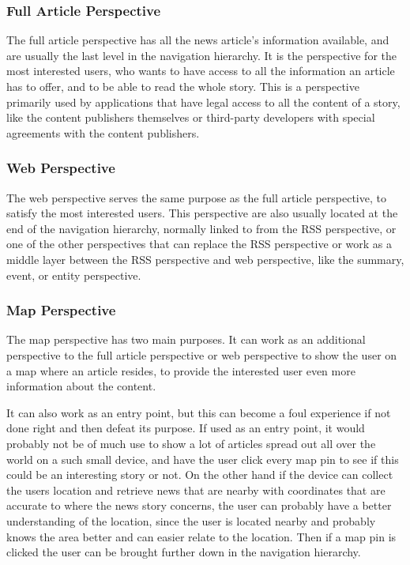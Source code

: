 \subsubsection{Full Article Perspective}
The full article perspective has all the news article's information available, and are usually the last level in the navigation hierarchy. It is the perspective for the most interested users, who wants to have access to all the information an article has to offer, and to be able to read the whole story. This is a perspective primarily used by applications that have legal access to all the content of a story, like the content publishers themselves or third-party developers with special agreements with the content publishers.

\subsubsection{Web Perspective}
The web perspective serves the same purpose as the full article perspective, to satisfy the most interested users. This perspective are also usually located at the end of the navigation hierarchy, normally linked to from the RSS perspective, or one of the other perspectives that can replace the RSS perspective or work as a middle layer between the RSS perspective and web perspective, like the summary, event, or entity perspective.


\subsubsection{Map Perspective}
The map perspective has two main purposes. It can work as an additional perspective to the full article perspective or web perspective to show the user on a map where an article resides, to provide the interested user even more information about the content.

It can also work as an entry point, but this can become a foul experience if not done right and then defeat its purpose. If used as an entry point, it would probably not be of much use to show a lot of articles spread out all over the world on a such small device, and have the user click every map pin to see if this could be an interesting story or not. On the other hand if the device can collect the users location and retrieve news that are nearby with coordinates that are accurate to where the news story concerns, the user can probably have a better understanding of the location, since the user is located nearby and probably knows the area better and can easier relate to the location. Then if a map pin is clicked the user can be brought further down in the navigation hierarchy.


